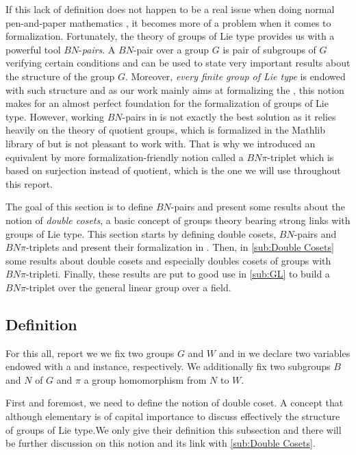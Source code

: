 If this lack of definition does not happen to be a real issue when doing normal pen-and-paper mathematics , it becomes more of a problem when it comes to formalization. Fortunately, the theory of groups of Lie type provides us with a powerful tool $BN$-\emph{pairs}. A $BN$-pair over a group $G$ is pair of subgroups of $G$ verifying certain conditions and can be used to state very important results about the structure of the group $G$. Moreover, \emph{every finite group of Lie type} is endowed with such structure and as our work mainly aims at formalizing the \CFSG, this notion makes for an almost perfect foundation for the formalization of groups of Lie type. 
    However, working $BN$-pairs in \Lean is not exactly the best solution as it relies heavily on the theory of quotient groups, which is formalized in the Mathlib library of \Lean but is not pleasant to work with. That is why we introduced an equivalent by more formalization-friendly notion called a $BN\pi$-triplet which is based on surjection instead of quotient, which is the one we will use throughout this report.

The goal of this section is to define $BN$-pairs and present some results about the notion of \emph{double cosets}, a basic concept of groups theory bearing strong links with groups of Lie type. This section starts by defining double cosets, $BN$-pairs and $BN\pi$-triplets and present their formalization in . Then, in \ref{sub:Double Cosets} some results about double cosets and especially doubles cosets of groups with $BN\pi$-tripleti. Finally, these results are put to good use in \ref{sub:GL} to build a $BN\pi$-triplet over the general linear group over a field.

\subsection{Definition}%

\label{sub:Definition}

For this all, report we we fix two groups $G$ and $W$ and in \Lean we declare two variables  endowed with a \lean{[Group G]} and \lean{[Group W]} instance, respectively. We additionally fix two subgroups $B$ and $N$ of $G$ and $\pi$ a group homomorphism from $N$ to $W$.

First and foremost, we need to define the notion of double coset. A concept that although elementary is of capital importance to discuss effectively the structure of groups of Lie type.We only give their definition this subsection and there will be further discussion on this notion and its link with \ref{sub:Double Cosets}.


